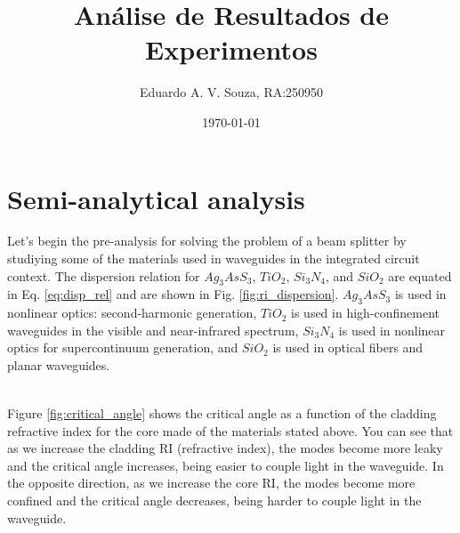 \documentclass[a4paper,12pt]{article}
\title{Análise de Resultados de Experimentos}
\author{Eduardo A. V. Souza, RA:250950}
\date{\today}
\begin{document}
\maketitle

\section{Semi-analytical analysis}
\label{sec:semi_analytical}

Let's begin the pre-analysis for solving the problem of a beam splitter by studiying some of the materials used in waveguides in the integrated circuit context. The dispersion relation for $Ag_3AsS_3$, $TiO_2$, $Si_3N_4$, and $SiO_2$ are equated in Eq. \ref{eq:disp_rel} and are shown in Fig. \ref{fig:ri_dispersion}. $Ag_3AsS_3$ is used in nonlinear optics: second-harmonic generation, $TiO_2$ is used in high-confinement waveguides in the visible and near-infrared spectrum, $Si_3N_4$ is used in nonlinear optics for supercontinuum generation, and $SiO_2$ is used in optical fibers and planar waveguides.

\begin{subequations}
    \begin{align}
        
    \end{align}
\end{subequations}

Figure \ref{fig:critical_angle} shows the critical angle as a function of the cladding refractive index for the core made of the materials stated above. You can see that as we increase the cladding RI (refractive index), the modes become more leaky and the critical angle increases, being easier to couple light in the waveguide. In the opposite direction, as we increase the core RI, the modes become more confined and the critical angle decreases, being harder to couple light in the waveguide.
\end{document}
